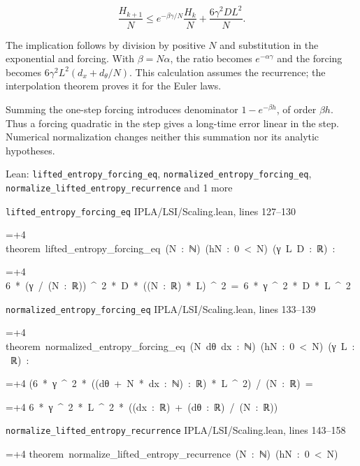 \documentclass[11pt,a4paper]{article}
\newlength{\leancharwidth}
\newenvironment{leancode}{\par\smallskip\begingroup\ttfamily\footnotesize\raggedright
  \settowidth{\leancharwidth}{M}\setlength{\parskip}{0pt}\setlength{\parindent}{0pt}
  \frenchspacing}{\par\endgroup\smallskip}
\newcommand{\leanline}[2]{\hangindent=\dimexpr#1\leancharwidth+4\leancharwidth\relax
  \hangafter=1\noindent\hspace*{#1\leancharwidth}#2\par}
\newcommand{\leansource}[1]{\par{\footnotesize\color{leanmuted}#1}\par}
\begin{document}
\[\frac{H_{k+1}}N\le e^{-\beta\gamma/N}\frac{H_k}N+\frac{6\gamma^2DL^2}{N}.\]

The implication follows by division by positive \(N\) and substitution in the exponential and forcing. With \(\beta=N\alpha\), the ratio becomes \(e^{-\alpha\gamma}\) and the forcing becomes \(6\gamma^2L^2(d_x+d_\theta/N)\). This calculation assumes the recurrence; the interpolation theorem proves it for the Euler laws.



Summing the one-step forcing introduces denominator \(1-e^{-\beta h}\), of order \(\beta h\). Thus a forcing quadratic in the step gives a long-time error linear in the step. Numerical normalization changes neither this summation nor its analytic hypotheses.

\begin{leanbox}{Lean: \texttt{lifted\_\allowbreak{}entropy\_\allowbreak{}forcing\_\allowbreak{}eq}, \texttt{normalized\_\allowbreak{}entropy\_\allowbreak{}forcing\_\allowbreak{}eq}, \texttt{normalize\_\allowbreak{}lifted\_\allowbreak{}entropy\_\allowbreak{}recurrence} and 1 more}
\leansource{\texttt{lifted\_\allowbreak{}entropy\_\allowbreak{}forcing\_\allowbreak{}eq} \quad IPLA/\allowbreak{}LSI/\allowbreak{}Scaling.lean, lines 127–130}
\begin{leancode}
\leanline{0}{theorem\ lifted\_entropy\_forcing\_eq\ (N\ :\ ℕ)\ (hN\ :\ 0\ <\ N)\ (γ\ L\ D\ :\ ℝ)\ :}
\leanline{4}{6\ *\ (γ\ /\ (N\ :\ ℝ))\ \textasciicircum{}\ 2\ *\ D\ *\ ((N\ :\ ℝ)\ *\ L)\ \textasciicircum{}\ 2\ =\ 6\ *\ γ\ \textasciicircum{}\ 2\ *\ D\ *\ L\ \textasciicircum{}\ 2}
\end{leancode}
\leansource{\texttt{normalized\_\allowbreak{}entropy\_\allowbreak{}forcing\_\allowbreak{}eq} \quad IPLA/\allowbreak{}LSI/\allowbreak{}Scaling.lean, lines 133–139}
\begin{leancode}
\leanline{0}{theorem\ normalized\_entropy\_forcing\_eq\ (N\ dθ\ dx\ :\ ℕ)\ (hN\ :\ 0\ <\ N)\ (γ\ L\ :\ ℝ)\ :}
\leanline{4}{(6\ *\ γ\ \textasciicircum{}\ 2\ *\ ((dθ\ +\ N\ *\ dx\ :\ ℕ)\ :\ ℝ)\ *\ L\ \textasciicircum{}\ 2)\ /\ (N\ :\ ℝ)\ =}
\leanline{6}{6\ *\ γ\ \textasciicircum{}\ 2\ *\ L\ \textasciicircum{}\ 2\ *\ ((dx\ :\ ℝ)\ +\ (dθ\ :\ ℝ)\ /\ (N\ :\ ℝ))}
\end{leancode}
\leansource{\texttt{normalize\_\allowbreak{}lifted\_\allowbreak{}entropy\_\allowbreak{}recurrence} \quad IPLA/\allowbreak{}LSI/\allowbreak{}Scaling.lean, lines 143–158}
\begin{leancode}
\leanline{0}{theorem\ normalize\_lifted\_entropy\_recurrence\ (N\ :\ ℕ)\ (hN\ :\ 0\ <\ N)}

\end{leancode}
\end{leanbox}
\end{document}
